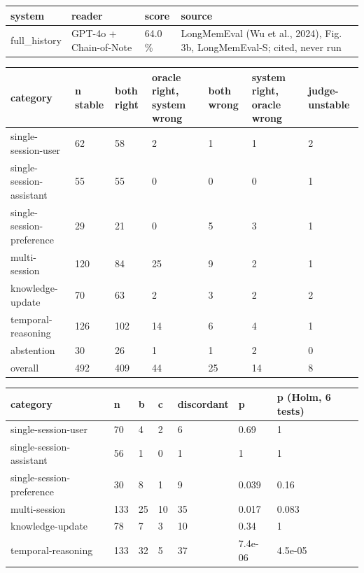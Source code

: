 \begin{tabular}{llll}
\toprule
system & reader & score & source \\
\midrule
full\_history & GPT-4o + Chain-of-Note & 64.0 \% & LongMemEval (Wu et al., 2024), Fig. 3b, LongMemEval-S; cited, never run \\
\bottomrule
\end{tabular}

\begin{tabular}{lllllll}
\toprule
category & n stable & both right & oracle right, system wrong & both wrong & system right, oracle wrong & judge-unstable \\
\midrule
single-session-user & 62 & 58 & 2 & 1 & 1 & 2 \\
single-session-assistant & 55 & 55 & 0 & 0 & 0 & 1 \\
single-session-preference & 29 & 21 & 0 & 5 & 3 & 1 \\
multi-session & 120 & 84 & 25 & 9 & 2 & 1 \\
knowledge-update & 70 & 63 & 2 & 3 & 2 & 2 \\
temporal-reasoning & 126 & 102 & 14 & 6 & 4 & 1 \\
abstention & 30 & 26 & 1 & 1 & 2 & 0 \\
overall & 492 & 409 & 44 & 25 & 14 & 8 \\
\bottomrule
\end{tabular}

\begin{tabular}{lllllll}
\toprule
category & n & b & c & discordant & p & p (Holm, 6 tests) \\
\midrule
single-session-user & 70 & 4 & 2 & 6 & 0.69 & 1 \\
single-session-assistant & 56 & 1 & 0 & 1 & 1 & 1 \\
single-session-preference & 30 & 8 & 1 & 9 & 0.039 & 0.16 \\
multi-session & 133 & 25 & 10 & 35 & 0.017 & 0.083 \\
knowledge-update & 78 & 7 & 3 & 10 & 0.34 & 1 \\
temporal-reasoning & 133 & 32 & 5 & 37 & 7.4e-06 & 4.5e-05 \\
\bottomrule
\end{tabular}

